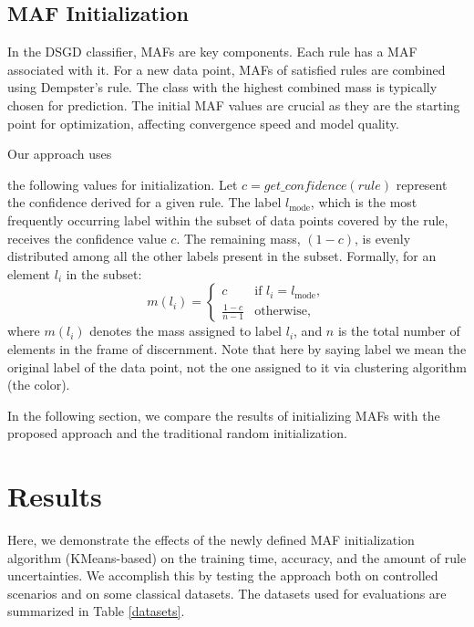 \documentclass[10pt,a4paper,oneside]{article}
\begin{document}
\subsection{MAF Initialization}\label{2.4}
{\color{red}In the DSGD classifier, MAFs are key components. Each rule has a MAF associated with it. For a new data point, MAFs of satisfied rules are combined using Dempster's rule. The class with the highest combined mass is typically chosen for prediction. The initial MAF values are crucial as they are the starting point for optimization, affecting convergence speed and model quality.

Our approach uses} the following values for initialization. Let $c = get\_confidence(rule)$ represent the confidence derived for a given rule. The label $l_{\text{mode}}$, which is the most frequently occurring label within the subset of data points covered by the rule, receives the confidence value $c$. The remaining mass, $(1 - c)$, is evenly distributed among all the other labels present in the subset. Formally, for an element $l_i$ in the subset:
\[
m(l_i) = 
\begin{cases} 
c & \text{if } l_i = l_{\text{mode}}, \\
\frac{1-c}{n-1} & \text{otherwise},
\end{cases}
\]
where $m(l_i)$ denotes the mass assigned to label $l_i$, and $n$ is the total number of elements in the frame of discernment. Note that here by saying label we mean the original label of the data point, not the one assigned to it via clustering algorithm (the color). 

{\color{red}In the following section, we compare the results of initializing MAFs with the proposed approach and the traditional random initialization.}

\section{Results}
Here{\color{black},} we demonstrate the effects of the newly defined MAF initialization algorithm (KMeans-based) on the training time, accuracy, and the amount of rule uncertainties. We accomplish this by testing the approach both on controlled scenarios and on some classical datasets. The datasets used for evaluations are summarized in Table \ref{datasets}. 
\\
\renewcommand{\arraystretch}{1.15}   %
\end{document}
